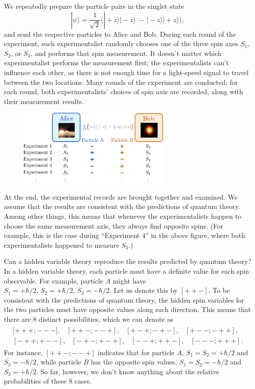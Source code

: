 \documentclass[pra,12pt]{revtex4}
\begin{document}
We repeatedly prepare the particle pairs in the singlet state
\begin{equation}
  |\psi\rangle = \frac{1}{\sqrt{2}} \Big(|\!+\!z\rangle|\!-\!z\rangle \,-\, |\!-\!z\rangle|\!+\!z\rangle\Big),
\end{equation}
and send the respective particles to Alice and Bob.  During each round
of the experiment, each experimentalist randomly chooses one of the
three spin axes $S_1$, $S_2$, or $S_3$, and performs that spin
measurement.  It doesn't matter which experimentalist performs the
measurement first; the experimentalists can't influence each other, as
there is not enough time for a light-speed signal to travel between
the two locations.  Many rounds of the experiment are conducted; for
each round, both experimentalists' choices of spin axis are recorded,
along with their measurement results.

\begin{figure}[h]
  \centering\includegraphics[width=0.67\textwidth]{bell}
\end{figure}

At the end, the experimental records are brought together and
examined.  We assume that the results are consistent with the
predictions of quantum theory.  Among other things, this means that
whenever the experimentalists happen to choose the same measurement
axis, they always find opposite spins.  (For example, this is the case
during ``Experiment 4'' in the above figure, where both
experimentalists happened to measure $S_3$.)

Can a hidden variable theory reproduce the results predicted by
quantum theory?  In a hidden variable theory, each particle must have
a definite value for each spin observable.  For example, particle $A$
might have $S_1 = +\hbar/2, \, S_2 = +\hbar/2, \, S_3 = -\hbar/2$.
Let us denote this by $[++-]$.  To be consistent with the predictions
of quantum theory, the hidden spin variables for the two particles
must have opposite values along each direction.  This means that there
are $8$ distinct possibilities, which we can denote as
\begin{align*}
  \begin{aligned}{[}{+++};{---}], \;\;\; [{++-};{--+}], \;\;\; [{+-+};{-+-}], \;\;\; [{+--};{-++}],\\ [{-++};{+--}], \;\;\; [{-+-};{+-+}], \;\;\; [{--+};{++-}], \;\;\; [{---};{+++}].\end{aligned}
\end{align*}
For instance, $[{++-};{--+}]$ indicates that for particle $A$, $S_1 =
S_2 = +\hbar/2$ and $S_3 = -\hbar/2$, while particle $B$ has the
opposite spin values, $S_1 = S_2 = -\hbar/2$ and $S_3 = +\hbar/2$.
So far, however, we don't know anything about the relative
probabilities of these 8 cases.
\end{document}
